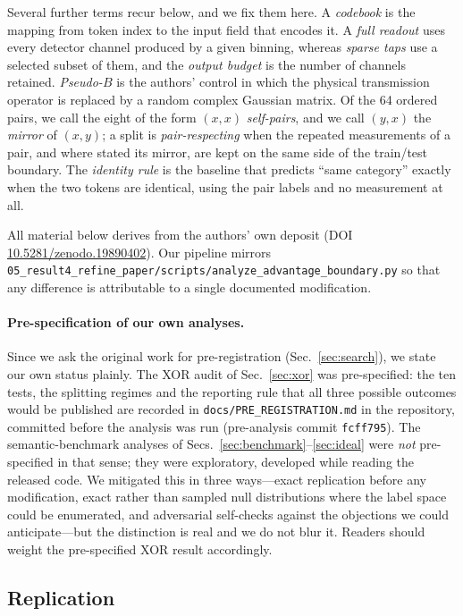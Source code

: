 \documentclass[11pt,a4paper]{article}
\newcommand{\code}[1]{\texttt{\small #1}}
\begin{document}
Several further terms recur below, and we fix them here. A \emph{codebook} is
the mapping from token index to the input field that encodes it. A \emph{full
readout} uses every detector channel produced by a given binning, whereas
\emph{sparse taps} use a selected subset of them, and the \emph{output budget}
is the number of channels retained. \emph{Pseudo-$B$} is the authors' control
in which the physical transmission operator is replaced by a random complex
Gaussian matrix. Of the 64 ordered pairs, we call the eight of the form
$(x,x)$ \emph{self-pairs}, and we call $(y,x)$ the \emph{mirror} of $(x,y)$; a
split is \emph{pair-respecting} when the repeated measurements of a pair, and
where stated its mirror, are kept on the same side of the train/test
boundary. The \emph{identity rule} is the baseline that predicts ``same
category'' exactly when the two tokens are identical, using the pair labels
and no measurement at all.

All material below derives from the authors' own deposit
(DOI \href{https://doi.org/10.5281/zenodo.19890402}{10.5281/zenodo.19890402}).
Our pipeline mirrors
\code{05\_result4\_refine\_paper/scripts/analyze\_advantage\_boundary.py}
so that any difference is attributable to a single documented modification.

\paragraph{Pre-specification of our own analyses.}
Since we ask the original work for pre-registration (Sec.~\ref{sec:search}),
we state our own status plainly. The XOR audit of Sec.~\ref{sec:xor} was
pre-specified: the ten tests, the splitting regimes and the reporting rule
that all three possible outcomes would be published are recorded in
\code{docs/PRE\_REGISTRATION.md} in the repository, committed before the
analysis was run (pre-analysis commit \code{fcff795}). The
semantic-benchmark analyses of Secs.~\ref{sec:benchmark}--\ref{sec:ideal} were
\emph{not} pre-specified in that sense; they were exploratory, developed while
reading the released code. We mitigated this in three ways---exact replication
before any modification, exact rather than sampled null distributions where
the label space could be enumerated, and adversarial self-checks against the
objections we could anticipate---but the distinction is real and we do not
blur it. Readers should weight the pre-specified XOR result accordingly.

\subsection{Replication}
\label{sec:replication}
\end{document}

